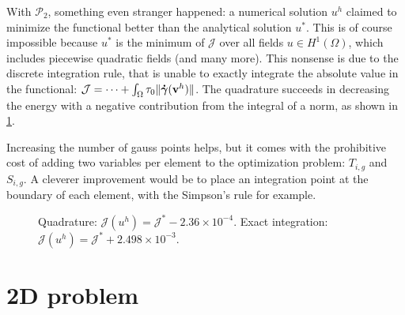 \documentclass[11 pt]{report}
\begin{document}
\pagebreak
With $\mathcal{P}_2$, something even stranger happened: a numerical solution $u^h$ claimed to minimize the functional better than the analytical solution $u^*$. This is of course impossible because $u^*$ is the minimum of $\mathcal{J}$ over all fields $u \in H^1(\Omega)$, which includes piecewise quadratic fields (and many more). This nonsense is due to the discrete integration rule, that is unable to exactly integrate the absolute value in the functional: $\mathcal{J} = \dots + \int_{\Omega}\tau_0 \|\boldsymbol{\dot \gamma}(\mathbf{v}^h)\|$. The quadrature succeeds in decreasing the energy with a negative contribution from the integral of a norm, as shown in \cref{fig:sensibility_quad}.

Increasing the number of gauss points helps, but it comes with the prohibitive cost of adding two variables per element to the optimization problem: $T_{i,g}$ and $S_{i,g}$. A cleverer improvement would be to place an integration point at the boundary of each element, with the Simpson's rule for example.

\begin{figure}[!b]
    \centering
    
    \caption{Quadrature: $\mathcal{J}(u^h) = \mathcal{J}^* - 2.36\times 10^{-4}$. Exact integration: $\mathcal{J}(u^h) = \mathcal{J}^* + 2.498\times 10^{-3}$.}
    \label{fig:sensibility_quad}
\end{figure}




\chapter{2D problem}

\end{document}
